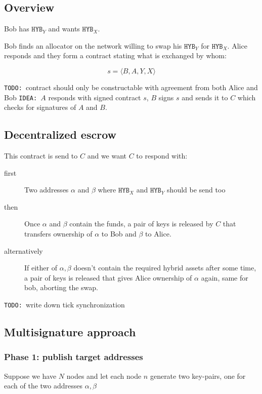 \documentclass[a4paper]{article}
\newcommand{\hyb}[1]{\ensuremath{\mathtt{ HYB }_{#1}}}
\newcommand{\TODO}{{\color{red}\texttt{TODO: }}}
\newcommand{\IDEA}{{\color{blue}\texttt{IDEA: }}}
\begin{document}
\subsection{Overview}

Bob has \hyb{Y} and wants \hyb{X}.

Bob finds an allocator on the network willing to swap his \hyb{Y} for \hyb{X}.
Alice responds and they form a contract stating what is exchanged by whom:

\[
s = \langle B, A, Y, X \rangle
\]

\TODO contract should only be constructable with agreement from both Alice and Bob
\IDEA $A$ responds with signed contract $s$, $B$ signs $s$ and sends it to $C$ which
checks for signatures of $A$ and $B$.

\subsection{Decentralized escrow}

This contract is send to $C$ and we want $C$ to respond with:

\begin{description}
\item[first] Two addresses $\alpha$ and $\beta$ where \hyb{X} and \hyb{Y} should be send too
\item[then] Once $\alpha$ and $\beta$ contain the funds, a pair of keys is released by $C$ that transfers ownership of $\alpha$ to Bob and $\beta$ to Alice.
\item[alternatively] If either of $\alpha,\beta$ doesn't contain the required hybrid assets after some time, a pair of keys is released that gives Alice ownership of $\alpha$ again, same for bob, aborting the swap.
\end{description}

\TODO write down tick synchronization

\subsection{Multisignature approach}

\subsubsection{Phase 1: publish target addresses}

Suppose we have $N$ nodes and let each node $n$ generate two key-pairs,
one for each of the two addresses $\alpha, \beta$
\end{document}
